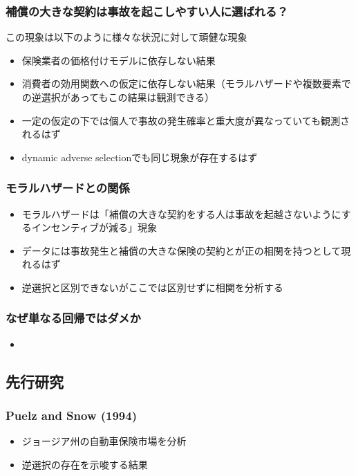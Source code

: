 \documentclass[dvipdfmx, 12pt]{beamer}
\begin{document}
\begin{frame}\frametitle{\small 補償の大きな契約は事故を起こしやすい人に選ばれる？}
この現象は以下のように様々な状況に対して頑健な現象
	\begin{itemize}
	\item 保険業者の価格付けモデルに依存しない結果
	\item 消費者の効用関数への仮定に依存しない結果（モラルハザードや複数要素での逆選択があってもこの結果は観測できる）
	\item 一定の仮定の下では個人で事故の発生確率と重大度が異なっていても観測されるはず
	\item dynamic adverse selectionでも同じ現象が存在するはず
	\end{itemize}
\end{frame}

\begin{frame}\frametitle{モラルハザードとの関係}
	\begin{itemize}
	\item モラルハザードは「補償の大きな契約をする人は事故を起越さないようにするインセンティブが減る」現象
	\item データには事故発生と補償の大きな保険の契約とが正の相関を持つとして現れるはず
	\item 逆選択と区別できないがここでは区別せずに相関を分析する
	\end{itemize}
\end{frame}

\begin{frame}\frametitle{なぜ単なる回帰ではダメか}
	\begin{itemize}
	\item 
	\end{itemize}
\end{frame}

\subsection{先行研究}
\begin{frame}\frametitle{Puelz and Snow (1994)}
	\begin{itemize}
	\item ジョージア州の自動車保険市場を分析
	\item 逆選択の存在を示唆する結果
	\end{itemize}
\end{frame}
\end{document}
